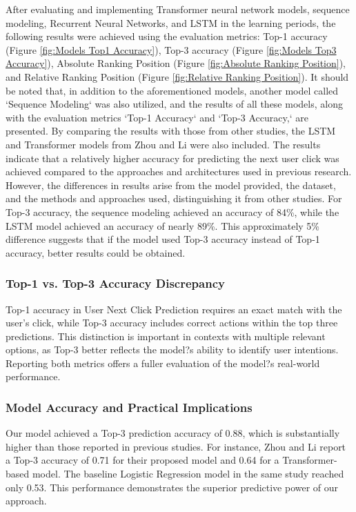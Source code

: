 \documentclass[sn-mathphys-num, Numbered]{sn-jnl}%
\theoremstyle{thmstyleone}%
\theoremstyle{thmstyletwo}%
\theoremstyle{thmstylethree}%
\providecommand{\DIFadd}[1]{{\protect\color{green!40!black}#1}} %
\providecommand{\DIFdel}[1]{}                      %
\providecommand{\DIFaddbegin}{} %
\providecommand{\DIFaddend}{} %
\providecommand{\DIFdelbegin}{} %
\providecommand{\DIFdelend}{} %
\newcommand{\DIFscaledelfig}{0.5}
\newlength{\DIFdelgraphicswidth} %
\newlength{\DIFdelgraphicsheight} %
\newcommand{\DIFaddincludegraphics}[2][]{{\color{blue}\fbox{\DIFOincludegraphics[#1]{#2}}}} %
\newcommand{\DIFdelincludegraphics}[2][]{%
\sbox{\DIFdelgraphicsbox}{\DIFOincludegraphics[#1]{#2}}%
\settoboxwidth{\DIFdelgraphicswidth}{\DIFdelgraphicsbox} %
\settoboxtotalheight{\DIFdelgraphicsheight}{\DIFdelgraphicsbox} %
\scalebox{\DIFscaledelfig}{%
\parbox[b]{\DIFdelgraphicswidth}{\usebox{\DIFdelgraphicsbox}\\[-\baselineskip] \rule{\DIFdelgraphicswidth}{0em}}\llap{\resizebox{\DIFdelgraphicswidth}{\DIFdelgraphicsheight}{%
\setlength{\unitlength}{\DIFdelgraphicswidth}%
\begin{picture}(1,1)%
\thicklines\linethickness{2pt} %
{\color[rgb]{1,0,0}\put(0,0){\framebox(1,1){}}}%
{\color[rgb]{1,0,0}\put(0,0){\line( 1,1){1}}}%
{\color[rgb]{1,0,0}\put(0,1){\line(1,-1){1}}}%
\end{picture}%
}\hspace*{3pt}}} %
} %
\DeclareRobustCommand{\DIFaddbegin}{\DIFOaddbegin \let\includegraphics\DIFaddincludegraphics} %
\DeclareRobustCommand{\DIFaddend}{\DIFOaddend \let\includegraphics\DIFOincludegraphics} %
\DeclareRobustCommand{\DIFdelbegin}{\DIFOdelbegin \let\includegraphics\DIFdelincludegraphics} %
\DeclareRobustCommand{\DIFdelend}{\DIFOaddend \let\includegraphics\DIFOincludegraphics} %
\begin{document}
\iffalse
\DIFaddend After evaluating and implementing Transformer neural network models, sequence modeling, Recurrent Neural Networks, and LSTM in the learning periods, the following results were achieved using the evaluation metrics: Top-1 accuracy (Figure \ref{fig:Models Top1 Accuracy}), Top-3 accuracy (Figure \ref{fig:Models Top3 Accuracy}), Absolute Ranking Position (Figure \ref{fig:Absolute Ranking Position}), and Relative Ranking Position (Figure \ref{fig:Relative Ranking Position}). It should be noted that, in addition to the aforementioned models, another model called `Sequence Modeling` was also utilized, and the results of all these models, along with the evaluation metrics `Top-1 Accuracy` and `Top-3 Accuracy,` are presented.
By comparing the results with those from other studies, the LSTM and Transformer models from Zhou and Li were also included. The results indicate that a relatively higher accuracy for predicting the next user click was achieved compared to the approaches and architectures used in previous research. However, the differences in results arise from the model provided, the dataset, and the methods and approaches used, distinguishing it from other studies.
For Top-3 accuracy, the sequence modeling achieved an accuracy of 84\%, while the LSTM model achieved an accuracy of nearly 89\%. This approximately 5\% difference suggests that if the model used Top-3 accuracy instead of Top-1 accuracy, better results could be obtained.

\subsubsection{Top-1 vs. Top-3 Accuracy Discrepancy}
Top-1 accuracy in User Next Click Prediction requires an exact match with the user\DIFdelbegin \DIFdel{?}\DIFdelend \DIFaddbegin \DIFadd{'}\DIFaddend s click, while Top-3 accuracy includes correct actions within the top three predictions. This distinction is important in contexts with multiple relevant options, as Top-3 better reflects the model?s ability to identify user intentions. Reporting both metrics offers a fuller evaluation of the model?s real-world performance.


\subsubsection{Model Accuracy and Practical Implications}
Our model achieved a Top-3 prediction accuracy of 0.88, which is substantially higher than those reported in previous studies. For instance, Zhou and Li \cite{zhou2021large} report a Top-3 accuracy of 0.71 for their proposed model and 0.64 for a Transformer-based model. The baseline Logistic Regression model in the same study reached only 0.53.  This performance demonstrates the superior predictive power of our approach.
\end{document}

